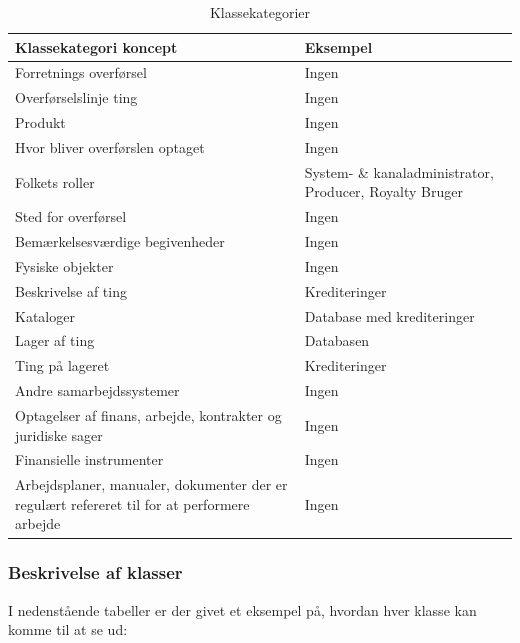 \begin{table}[H]
    \begin{tabularx}{\textwidth}{|X|X|}
        \hline
        \textbf{Klassekategori koncept} & \textbf{Eksempel} \\
        \hline
        Forretnings overførsel & Ingen\\
        \hline
        Overførselslinje ting & Ingen\\
        \hline
        Produkt & Ingen \\
        \hline
        Hvor bliver overførslen optaget  & Ingen \\
        \hline
        Folkets roller & System- \& kanaladministrator, Producer, Royalty Bruger\\
        \hline
        Sted for overførsel & Ingen \\
        \hline
        Bemærkelsesværdige begivenheder & Ingen \\
        \hline
        Fysiske objekter & Ingen \\
        \hline
        Beskrivelse af ting & Krediteringer\\
        \hline
        Kataloger & Database med krediteringer\\
        \hline
        Lager af ting & Databasen\\
        \hline
        Ting på lageret & Krediteringer\\
        \hline
        Andre samarbejdssystemer & Ingen\\
        \hline
        Optagelser af finans, arbejde, kontrakter og juridiske sager &  Ingen \\
        \hline
        Finansielle instrumenter & Ingen\\
        \hline
        Arbejdsplaner, manualer, dokumenter der er regulært refereret til for at performere arbejde & Ingen\\
        \hline
    \end{tabularx}
    \caption{Klassekategorier}
    \label{table:class_categories}
\end{table}

\subsubsection{Beskrivelse af klasser}
 I nedenstående tabeller er der givet et eksempel på, hvordan hver klasse kan komme til at se ud:
 

